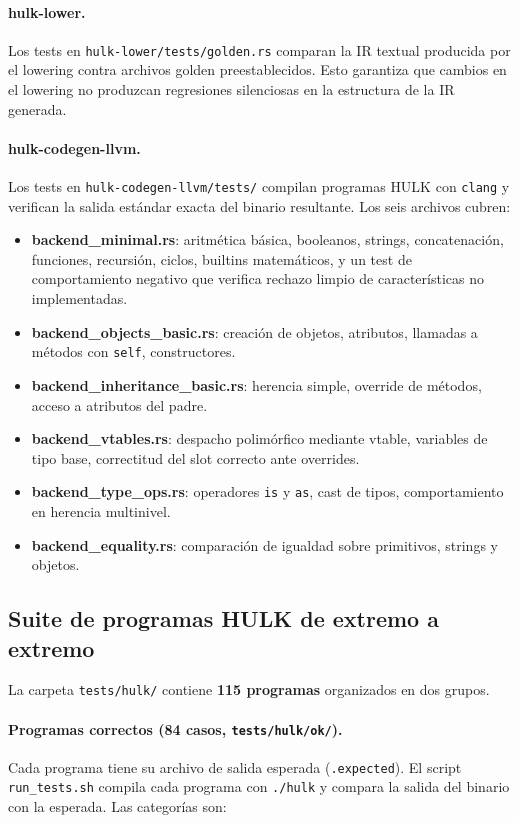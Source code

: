 \documentclass[12pt,letterpaper]{article}
\newcommand{\hulk}{\textsc{HULK}}
\newcommand{\src}[1]{\texttt{#1}}
\begin{document}
\paragraph{hulk-lower.}
Los tests en \src{hulk-lower/tests/golden.rs} comparan la IR textual producida por el lowering contra archivos golden preestablecidos. Esto garantiza que cambios en el lowering no produzcan regresiones silenciosas en la estructura de la IR generada.

\paragraph{hulk-codegen-llvm.}
Los tests en \src{hulk-codegen-llvm/tests/} compilan programas \hulk{} con \src{clang} y verifican la salida estándar exacta del binario resultante. Los seis archivos cubren:

\begin{itemize}
    \item \textbf{backend\_minimal.rs}: aritmética básica, booleanos, strings, concatenación, funciones, recursión, ciclos, builtins matemáticos, y un test de comportamiento negativo que verifica rechazo limpio de características no implementadas.
    \item \textbf{backend\_objects\_basic.rs}: creación de objetos, atributos, llamadas a métodos con \src{self}, constructores.
    \item \textbf{backend\_inheritance\_basic.rs}: herencia simple, override de métodos, acceso a atributos del padre.
    \item \textbf{backend\_vtables.rs}: despacho polimórfico mediante vtable, variables de tipo base, correctitud del slot correcto ante overrides.
    \item \textbf{backend\_type\_ops.rs}: operadores \src{is} y \src{as}, cast de tipos, comportamiento en herencia multinivel.
    \item \textbf{backend\_equality.rs}: comparación de igualdad sobre primitivos, strings y objetos.
\end{itemize}

\subsection{Suite de programas \hulk{} de extremo a extremo}

La carpeta \src{tests/hulk/} contiene \textbf{115 programas} organizados en dos grupos.

\paragraph{Programas correctos (84 casos, \src{tests/hulk/ok/}).}
Cada programa tiene su archivo de salida esperada (\src{.expected}). El script \src{run\_tests.sh} compila cada programa con \src{./hulk} y compara la salida del binario con la esperada. Las categorías son:
\end{document}
